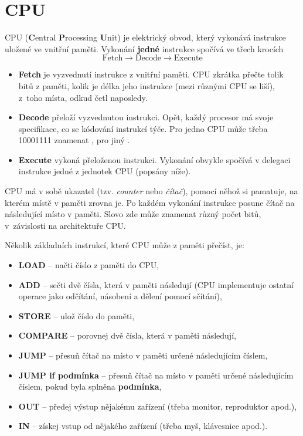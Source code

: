 \documentclass[a4paper,11pt]{article}
\begin{document}
\thispagestyle{fancy}

\section*{CPU}

CPU (\textbf{C}entral \textbf{P}rocessing \textbf{U}nit) je elektrický obvod,
který vykonává instrukce uložené ve vnitřní paměti. Vykonání \textbf{jedné}
instrukce spočívá ve třech krocích
\[
 \text{Fetch} \to \text{Decode} \to \text{Execute}
\]
\begin{itemize}
 \item \textbf{Fetch} je vyzvednutí instrukce z vnitřní paměti. CPU zkrátka
  přečte tolik bitů z paměti, kolik je délka jeho instrukce (mezi různými CPU se
  liší), z~toho místa, odkud četl naposledy.
 \item \textbf{Decode} přeloží vyzvednutou instrukci. Opět, každý procesor má
  svoje specifikace, co se kódování instrukcí týče. Pro jedno CPU může třeba
  10001111 znamenat , pro jiný .
 \item \textbf{Execute} vykoná přeloženou instrukci. Vykonání obvykle spočívá v
  delegaci instrukce jedné z jednotek CPU (popsány níže).
\end{itemize}

CPU má v sobě ukazatel (tzv. \emph{counter} nebo \emph{čítač}), pomocí něhož si
pamatuje, na kterém místě v paměti zrovna je. Po každém vykonání instrukce
posune čítač na následující místo v paměti. Slovo  zde může znamenat
různý počet bitů, v~závislosti na architektuře CPU. 

Několik základních instrukcí, které CPU může z paměti přečíst, je:
\begin{itemize}
 \item \textbf{LOAD} -- načti číslo z paměti do CPU,
 \item \textbf{ADD} -- sečti dvě čísla, která v paměti následují (CPU
  implementuje ostatní operace jako odčítání, násobení a dělení pomocí sčítání),
 \item \textbf{STORE} -- ulož číslo do paměti,
 \item \textbf{COMPARE} -- porovnej dvě čísla, která v paměti následují,
 \item \textbf{JUMP} -- přesuň čítač na místo v paměti určené následujícím
  číslem,
 \item \textbf{JUMP if podmínka} -- přesuň čítač na místo v paměti určené
  následujícím číslem, pokud byla splněna \textbf{podmínka},
 \item \textbf{OUT} -- předej výstup nějakému zařízení (třeba monitor,
  reproduktor apod.),
 \item \textbf{IN} -- získej vstup od nějakého zařízení (třeba myš, klávesnice
  apod.).
\end{itemize}
\end{document}
